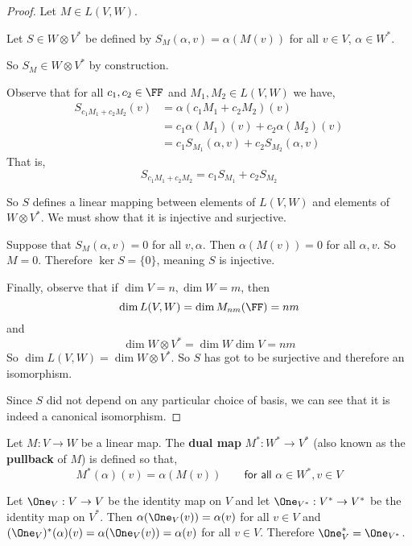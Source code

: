\begin{proof}Let $M \in L(V,W)$. 

Let $S \in W\otimes V^*$ be defined by $S_M(\alpha,v) = \alpha(M(v))$ for all $v \in V$, $\alpha \in W^*$. 

So $S_M \in W\otimes V^*$ by construction. 

Observe that for all $c_1,c_2\in \FF$ and $M_1,M_2\in L(V,W)$ we have,
\begin{align*}S_{c_1 M_1+c_2 M_2}(v) &= \alpha(c_1 M_1+c_2M_2)(v) \\&= c_1 \alpha(M_1)(v)+c_2\alpha(M_2)(v) 
\\&= c_1 S_{M_1}(\alpha,v) + c_2 S_{M_2}(\alpha,v)\end{align*}
That is,
\[S_{c_1M_1+c_2M_2}=c_1S_{M_1}+c_2S_{M_2}\]

So $S$ defines a linear mapping between elements of $L(V,W)$ and elements of $W\otimes V^*$. We must show that it is injective and surjective.

Suppose that $S_M(\alpha,v)=0$ for all $v,\alpha$. Then $\alpha(M(v))=0$ for all $\alpha,v$. So $M=0$. Therefore $\ker S = \{0\}$, meaning $S$ is injective. 

Finally, observe that if $\dim V = n, \dim W = m$, then 
\[\dim L(V,W)= \dim M_{nm}(\FF) = nm\]
and 
\[\dim W\otimes V^* = \dim W \dim V = nm\]
So $\dim L(V,W)=\dim W\otimes V^*$. So $S$ has got to be surjective and therefore an isomorphism. 

Since $S$ did not depend on any particular choice of basis, we can see that it is indeed a canonical isomorphism. \end{proof}

\begin{defn}
    Let $M : V \to W$ be a linear map. The \textbf{dual map} $M^* : W^* \to V^*$ (also known as the \textbf{pullback} of $M$) is defined so that,
    \begin{equation}M^*(\alpha)(v) = \alpha(M(v)) \qquad \textsf{for all } \alpha\in W^*, v \in V\end{equation}
\end{defn}
Let $\One_V : V \to V$ be the identity map on $V$ and let $\One_{V^*} : V^* \to V^*$ be the identity map on $V^*$. Then $\alpha(\One_V(v)) = \alpha(v)$ for all $v \in V$ and $(\One_V)^*(\alpha)(v) = \alpha(\One_V(v))=\alpha(v)$ for all $v \in V$. Therefore $\One_V^* = \One_{V^*}$.

